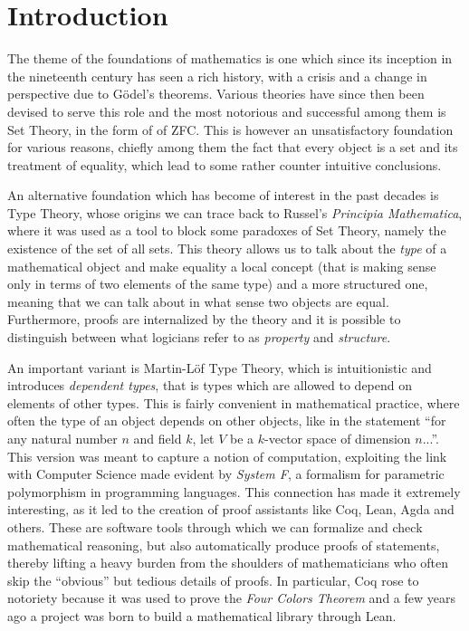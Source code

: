 \chapter*{Introduction}

The theme of the foundations of mathematics is one which since its inception in
the nineteenth century has seen a rich history, with a crisis and a change in
perspective due to G{\"o}del's theorems. Various theories have since then been
devised to serve this role and the most notorious and successful among them is
Set Theory, in the form of of ZFC. This is however an unsatisfactory foundation
for various reasons, chiefly among them the fact that every object is a set and
its treatment of equality, which lead to some rather counter intuitive
conclusions.

An alternative foundation which has become of interest in the past decades is
Type Theory, whose origins we can trace back to Russel's \emph{Principia
Mathematica}, where it was used as a tool to block some paradoxes of Set Theory,
namely the existence of the set of all sets. This theory allows us to talk about
the \emph{type} of a mathematical
object and make equality a local concept (that is making sense only in terms of
two elements of the same type) and a more structured one, meaning that we can
talk about in what sense two objects are equal. Furthermore, proofs are
internalized by the theory and it is possible to distinguish between what
logicians refer to as \emph{property} and \emph{structure}.

\noindent
An important variant is Martin-L{\"o}f Type Theory, which is
intuitionistic and introduces \emph{dependent types}, that is types which are
allowed to depend on elements of other types. This is fairly convenient in
mathematical practice, where often the type of an object depends on other
objects, like in the statement ``for any natural number $n$ and field
$k$, let $V$ be a $k$-vector space of dimension $n$...''. This version was meant
to capture a notion of computation, exploiting the link with Computer Science
made evident by \emph{System F}, a formalism for parametric polymorphism in
programming languages. This connection
has made it extremely interesting, as it led to the
creation of proof assistants like Coq, Lean, Agda and others. These are software
tools through which we can formalize and check mathematical reasoning, but also
automatically produce proofs of statements, thereby lifting a heavy burden from
the shoulders of mathematicians who often skip the ``obvious'' but tedious
details of proofs. In particular, Coq rose to notoriety because it was used to
prove the \emph{Four Colors Theorem} and a few years ago a project was born to
build a mathematical library through Lean.

